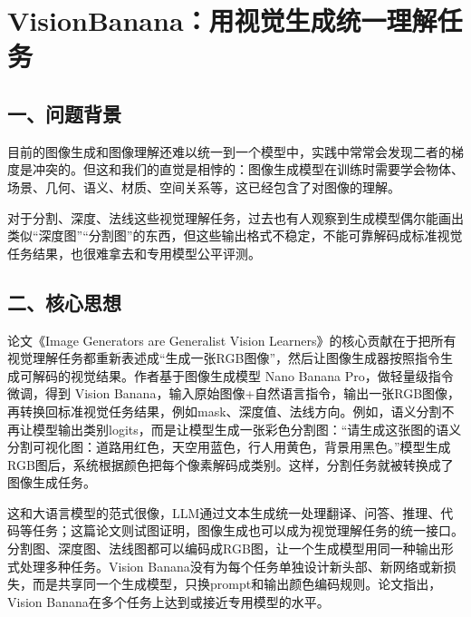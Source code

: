 \setcounter{section}{3}

\hypertarget{visionbananaux7528ux89c6ux89c9ux751fux6210ux7edfux4e00ux7406ux89e3ux4efbux52a1}{%
\section{VisionBanana：用视觉生成统一理解任务}\label{visionbananaux7528ux89c6ux89c9ux751fux6210ux7edfux4e00ux7406ux89e3ux4efbux52a1}}

\hypertarget{ux4e00ux95eeux9898ux80ccux666f-6}{%
\subsection{一、问题背景}\label{ux4e00ux95eeux9898ux80ccux666f-6}}

目前的图像生成和图像理解还难以统一到一个模型中，实践中常常会发现二者的梯度是冲突的。但这和我们的直觉是相悖的：图像生成模型在训练时需要学会物体、场景、几何、语义、材质、空间关系等，这已经包含了对图像的理解。

对于分割、深度、法线这些视觉理解任务，过去也有人观察到生成模型偶尔能画出类似``深度图''``分割图''的东西，但这些输出格式不稳定，不能可靠解码成标准视觉任务结果，也很难拿去和专用模型公平评测。

\hypertarget{ux4e8cux6838ux5fc3ux601dux60f3-5}{%
\subsection{二、核心思想}\label{ux4e8cux6838ux5fc3ux601dux60f3-5}}

论文《Image Generators are Generalist Vision Learners》的核心贡献在于把所有视觉理解任务都重新表述成``生成一张RGB图像''，然后让图像生成器按照指令生成可解码的视觉结果。作者基于图像生成模型 Nano Banana Pro，做轻量级指令微调，得到 Vision Banana，输入原始图像+自然语言指令，输出一张RGB图像，再转换回标准视觉任务结果，例如mask、深度值、法线方向。例如，语义分割不再让模型输出类别logits，而是让模型生成一张彩色分割图：``请生成这张图的语义分割可视化图：道路用红色，天空用蓝色，行人用黄色，背景用黑色。''模型生成RGB图后，系统根据颜色把每个像素解码成类别。这样，分割任务就被转换成了图像生成任务。

这和大语言模型的范式很像，LLM通过文本生成统一处理翻译、问答、推理、代码等任务；这篇论文则试图证明，图像生成也可以成为视觉理解任务的统一接口。分割图、深度图、法线图都可以编码成RGB图，让一个生成模型用同一种输出形式处理多种任务。Vision Banana没有为每个任务单独设计新头部、新网络或新损失，而是共享同一个生成模型，只换prompt和输出颜色编码规则。论文指出，Vision Banana在多个任务上达到或接近专用模型的水平。

